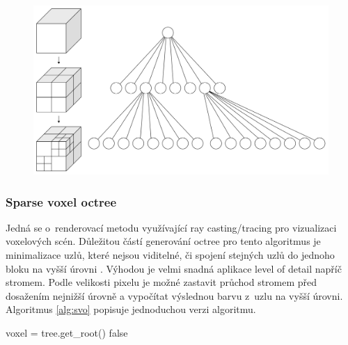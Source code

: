 \begin{figure}[H]
	\centering
	\includegraphics[scale=0.12]{obrazky-figures/Octree2.pdf}
	\captionsetup{justification=centering}
	\label{fig:slabs}
\end{figure}


\subsubsection{Sparse voxel octree}\label{svo_alg}
Jedná se o~renderovací metodu využívající ray casting/tracing pro vizualizaci voxelových scén. Důležitou částí generování octree pro tento algoritmus je minimalizace uzlů, které nejsou viditelné, či spojení stejných uzlů do jednoho bloku na vyšší úrovni \cite{Laine2011EfficientSV}. Výhodou je velmi snadná aplikace level of detail napříč stromem. Podle velikosti pixelu je možné zastavit průchod stromem před dosažením nejnižší úrovně a vypočítat výslednou barvu z~uzlu na vyšší úrovni. Algoritmus \ref{alg:svo} popisuje jednoduchou verzi algoritmu.

\begin{center}
	\begin{czechalgorithm}[H] \label{alg:svo}
		voxel = tree.get\_root()\;
		\KwRet false\;
		\caption{Sparse voxel octree ray casting}
	\end{czechalgorithm}
\end{center}


